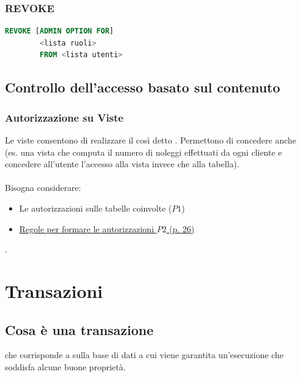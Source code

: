 \documentclass[12pt, a4paper]{report}
\begin{document}
    \subsection{REVOKE}
    \begin{lstlisting}[language=SQL]
        REVOKE [ADMIN OPTION FOR]
        <lista ruoli>
        FROM <lista utenti>
    \end{lstlisting}
    \section{Controllo dell'accesso basato sul contenuto}
    \subsection{Autorizzazione su Viste}
    Le viste consentono di realizzare il così detto
    . Permettono di concedere anche  (es. una vista che computa il numero di noleggi effettuati da ogni cliente e concedere all'utente l'accesso alla vista invece che alla tabella).\\
    \\
    Bisogna considerare:
    \begin{itemize}
        \item Le autorizzazioni sulle tabelle coinvolte ($P1$)
        \item \href{https://2023.aulaweb.unige.it/pluginfile.php/352757/mod_resource/content/3/LinguaggioSQLParte4DatiDerivati-23-24.pdf}{Regole per formare le autorizzazioni $P2$ (p. 26)}
    \end{itemize}
    .
    \chapter{Transazioni}
    \section{Cosa è una transazione}
     che corrisponde a  sulla base di dati a cui viene garantita un'esecuzione che soddisfa alcune buone proprietà.
\end{document}
